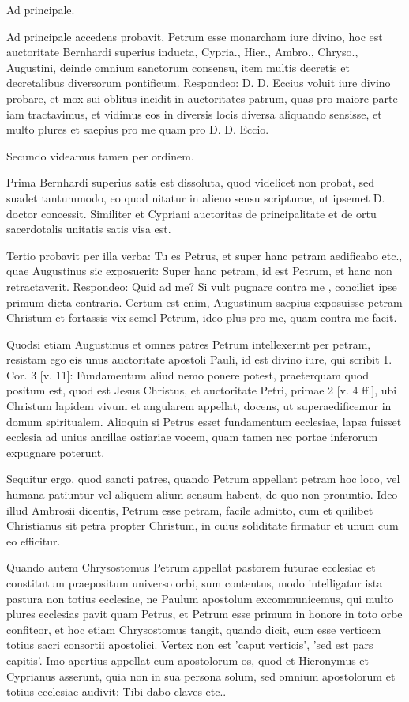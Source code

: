 Ad principale.

Ad principale accedens probavit, Petrum esse monarcham iure divino, hoc est auctoritate Bernhardi superius inducta, Cypria., Hier., Ambro., Chryso., Augustini, deinde omnium sanctorum consensu, item multis decretis et decretalibus diversorum pontificum. Respondeo: D. D. Eccius voluit iure divino probare, et mox sui oblitus incidit in auctoritates patrum, quas pro maiore parte iam tractavimus, et vidimus eos in diversis locis diversa aliquando sensisse, et multo plures et saepius pro me quam pro D. D. Eccio.

Secundo videamus tamen per ordinem.

Prima Bernhardi superius satis est dissoluta, quod videlicet non probat, sed suadet tantummodo, eo quod nitatur in alieno sensu scripturae, ut ipsemet D. doctor concessit. Similiter et Cypriani auctoritas de principalitate et de ortu sacerdotalis unitatis satis visa est.

Tertio probavit per illa verba: Tu es Petrus, et super hanc petram aedificabo etc., quae Augustinus sic exposuerit: Super hanc petram, id est Petrum, et hanc non retractaverit. Respondeo: Quid ad me? Si vult pugnare contra me \marginpar{\small[278]}, conciliet ipse primum dicta contraria. Certum est enim, Augustinum saepius exposuisse petram Christum et fortassis vix semel Petrum, ideo plus pro me, quam contra me facit.

Quodsi etiam Augustinus et omnes patres Petrum intellexerint per petram, resistam ego eis unus auctoritate apostoli Pauli, id est divino iure, qui scribit 1. Cor. 3 [v. 11]: Fundamentum aliud nemo ponere potest, praeterquam quod positum est, quod est Jesus Christus, et auctoritate Petri, primae 2 [v. 4 ff.], ubi Christum lapidem vivum et angularem appellat, docens, ut superaedificemur in domum spiritualem. Alioquin si Petrus esset fundamentum ecclesiae, lapsa fuisset ecclesia ad unius ancillae ostiariae vocem, quam tamen nec portae inferorum expugnare poterunt.

Sequitur ergo, quod sancti patres, quando Petrum appellant petram hoc loco, vel humana patiuntur vel aliquem alium sensum habent, de quo non pronuntio. Ideo illud Ambrosii dicentis, Petrum esse petram, facile admitto, cum et quilibet Christianus sit petra propter Christum, in cuius soliditate firmatur et unum cum eo efficitur.

Quando autem Chrysostomus Petrum appellat pastorem futurae ecclesiae et constitutum praepositum universo orbi, sum contentus, modo intelligatur ista pastura non totius ecclesiae, ne Paulum apostolum excommunicemus, qui multo plures ecclesias pavit quam Petrus, et Petrum esse primum in honore in toto orbe confiteor, et hoc etiam Chrysostomus tangit, quando dicit, eum esse verticem totius sacri consortii apostolici. Vertex non est 'caput verticis', 'sed est pars capitis'. Imo apertius appellat eum apostolorum os, quod et Hieronymus et Cyprianus asserunt, quia non in sua persona solum, sed omnium apostolorum et totius ecclesiae audivit: Tibi dabo claves etc..

